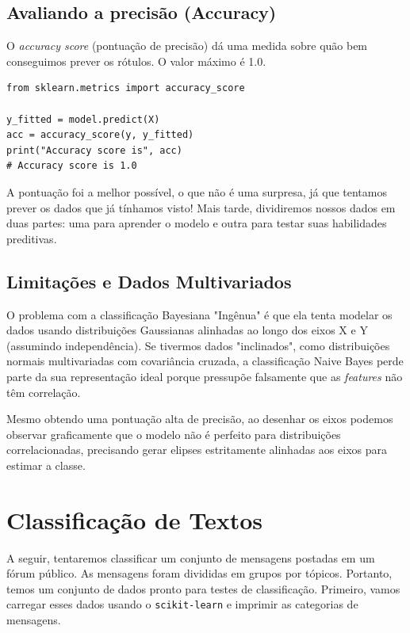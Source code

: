 \documentclass[11pt,a4paper]{article}
\begin{document}
\subsection{Avaliando a precisão (Accuracy)}

O \emph{accuracy score} (pontuação de precisão) dá uma medida sobre quão bem conseguimos prever os rótulos. O valor máximo é 1.0.

\begin{lstlisting}
from sklearn.metrics import accuracy_score

y_fitted = model.predict(X)
acc = accuracy_score(y, y_fitted)
print("Accuracy score is", acc)
# Accuracy score is 1.0
\end{lstlisting}

A pontuação foi a melhor possível, o que não é uma surpresa, já que tentamos prever os dados que já tínhamos visto! Mais tarde, dividiremos nossos dados em duas partes: uma para aprender o modelo e outra para testar suas habilidades preditivas.

\subsection{Limitações e Dados Multivariados}

O problema com a classificação Bayesiana "Ingênua" é que ela tenta modelar os dados usando distribuições Gaussianas alinhadas ao longo dos eixos X e Y (assumindo independência). Se tivermos dados "inclinados", como distribuições normais multivariadas com covariância cruzada, a classificação Naive Bayes perde parte da sua representação ideal porque pressupõe falsamente que as \emph{features} não têm correlação.

Mesmo obtendo uma pontuação alta de precisão, ao desenhar os eixos podemos observar graficamente que o modelo não é perfeito para distribuições correlacionadas, precisando gerar elipses estritamente alinhadas aos eixos para estimar a classe.

\section{Classificação de Textos}

A seguir, tentaremos classificar um conjunto de mensagens postadas em um fórum público. As mensagens foram divididas em grupos por tópicos. Portanto, temos um conjunto de dados pronto para testes de classificação. Primeiro, vamos carregar esses dados usando o \texttt{scikit-learn} e imprimir as categorias de mensagens.
\end{document}
